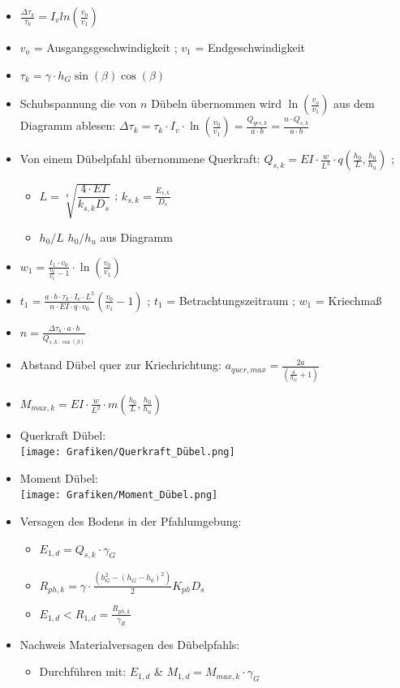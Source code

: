 \documentclass[fleqn,twoside]{article}
\begin{document}
\begin{itemize}
    \item $\frac{\Delta \tau_k}{\tau_k} = I_v ln(\frac{v_0}{v_1})$
    \item $v_o$ = Ausgangsgeschwindigkeit ; $v_1$ = Endgeschwindigkeit
    \item $\tau_k = \gamma \cdot h_G \sin(\beta) \cos(\beta)$
    \item Schubspannung die von $n$ Dübeln übernommen wird $\ln\left(\frac{v_o}{v_1}\right)$ aus dem Diagramm ablesen: $\Delta \tau_k = \tau_k \cdot I_v \cdot \ln(\frac{v_0}{v_1}) = \frac{Q_{ges,k}}{a\cdot b} = \frac{n \cdot Q_{s,k}}{a \cdot b}$
    \item Von einem Dübelpfahl übernommene Querkraft: $Q_{s,k} = EI \cdot \frac{w}{L^3} \cdot q \left( \frac{h_0}{L} , \frac{h_0}{h_u}\right)$ ; 
    \begin{itemize}
        \item $L = \sqrt[4]{\dfrac{4\cdot EI}{k_{s,k} D_s}}$ ; $k_{s,k} = \frac{E_{s,k}}{D_s}$
        \item $h_0/L$ $h_0/h_u$ aus Diagramm
    \end{itemize}
    
    \item $w_1 = \frac{t_1 \cdot v_0}{\frac{v_0}{v_1}-1} \cdot \ln \left( \frac{v_0}{v_1} \right)$
    \item $t_1 = \frac{a \cdot b \cdot \tau_k \cdot I_v \cdot L^3}{n \cdot EI \cdot q \cdot v_0} \left( \frac{v_0}{v_1} -1 \right)$ ; $t_1$ = Betrachtungszeitraum ; $w_1$ = Kriechmaß
    \item $n = \frac{\Delta \tau_k \cdot a \cdot b}{Q_{s,k \cdot \cos(\beta)}}$
    \item Abstand Dübel quer zur Kriechrichtung: $a_{quer,max} = \frac{2a}{\left( \frac{a}{h_G} +1 \right)}$
    \item $M_{max,k} = EI \cdot \frac{w}{L^2} \cdot m \left( \frac{h_0}{L},\frac{h_0}{h_u} \right)$
    \item Querkraft Dübel:\\
    \texttt{[image: Grafiken/Querkraft\_Dübel.png]}
    \item Moment Dübel:\\
    \texttt{[image: Grafiken/Moment\_Dübel.png]}

    \item Versagen des Bodens in der Pfahlumgebung:
        \begin{itemize}
            \item $E_{1,d} = Q_{s,k} \cdot \gamma_G$
            \item $R_{ph,k} = \gamma \cdot \frac{(h_G^2 - (h_G-h_0)^2)}{2} K_{ph} D_{s}$
            \item $E_{1,d} < R_{1,d} = \frac{R_{ph,k}}{\gamma_{R}}$
        \end{itemize}
    \item Nachweis Materialversagen des Dübelpfahls:
        \begin{itemize}
            \item Durchführen mit: $E_{1,d}$ \& $M_{1,d} = M_{max,k} \cdot \gamma_{G}$ 
        \end{itemize}
    
\end{itemize}
\end{document}
